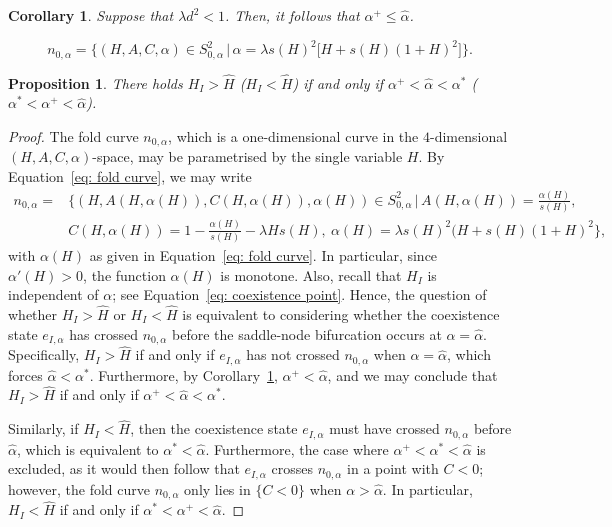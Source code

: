 \documentclass[10pt,a4paper]{amsart}
\newtheorem{cor}{Corollary}
\newtheorem{prop}{Proposition}
\begin{document}
\begin{cor}
    Suppose that $\lambda d^2<1$. Then, it follows that $\alpha^{+}\leq\hat\alpha$.
    \label{cor: hat bound}
\end{cor}

\begin{equation}
    n_{0,\alpha} = \big\{(H,A,C,\alpha)\in S^2_{0,\alpha}\,\big|\, \alpha  = \lambda s(H)^2\big[H+s(H)(1+H)^2\big]\big\}.
    \label{eq: fold curve}
\end{equation}

\begin{prop} There holds $H_I>\hat{H}$ ($H_I<\hat{H}$) if and only if $\alpha^+<\hat{\alpha}<\alpha^{\ast}$ ($\alpha^{\ast}<\alpha^+<\hat{\alpha}$).
\label{prop: ordering}
\end{prop}

\begin{proof}
The fold curve $n_{0,\alpha}$, which is a one-dimensional curve in the $4$-dimensional $(H,A,C,\alpha)$-space, may be parametrised by the single variable $H$. By Equation~\eqref{eq: fold curve}, we may write
 \begin{equation}
 \begin{split}
     n_{0,\alpha}=&\biggl\{(H,A(H,\alpha(H)),C(H,\alpha(H)),\alpha(H))\in S_{0,\alpha}^{2}\,\bigg|\,  A(H,\alpha(H))=\frac{\alpha(H)}{s(H)}, \\ & C(H,\alpha(H))=1-\frac{\alpha(H)}{s(H)}-\lambda Hs(H),\ \alpha(H)=\lambda s(H)^2(H+s(H)(1+H)^2\biggr\},
     \label{eq: fold curve param}
\end{split}
 \end{equation}
with $\alpha(H)$ as given in Equation~\eqref{eq: fold curve}. In particular, since $\alpha'(H)>0$, the function $\alpha(H)$ is monotone. Also, recall that $H_I$ is independent of $\alpha$; see Equation~\eqref{eq: coexistence point}. Hence, the question of whether $H_I>\hat{H}$ or $H_I<\hat{H}$ is equivalent to considering whether the coexistence state $e_{I,\alpha}$ has crossed $n_{0,\alpha}$ before the saddle-node bifurcation occurs at $\alpha=\hat{\alpha}$. Specifically, $H_I>\hat{H}$ if and only if $e_{I,\alpha}$ has not crossed $n_{0,\alpha}$ when $\alpha=\hat{\alpha}$, which forces $\hat\alpha<\alpha^\ast$. Furthermore, by Corollary~\ref{cor: hat bound}, $\alpha^+<\hat\alpha$, and we may conclude that $H_I>\hat{H}$ if and only if $\alpha^+<\hat{\alpha}<\alpha^{\ast}$.

Similarly, if $H_I<\hat{H}$, then the coexistence state $e_{I,\alpha}$ must have crossed $n_{0,\alpha}$ before $\hat\alpha$, which is equivalent to $\alpha^{\ast}<\hat\alpha$. Furthermore, the case where $\alpha^+<\alpha^{\ast}<\hat\alpha$ is excluded, as it would then follow that $e_{I,\alpha}$ crosses $n_{0,\alpha}$ in a point with $C<0$; however, the fold curve $n_{0,\alpha}$ only lies in $\{C<0\}$ when $\alpha>\hat\alpha$. In particular, $H_I<\hat{H}$ if and only if $\alpha^{\ast}<\alpha^+<\hat\alpha$. 
\end{proof}
\end{document}

